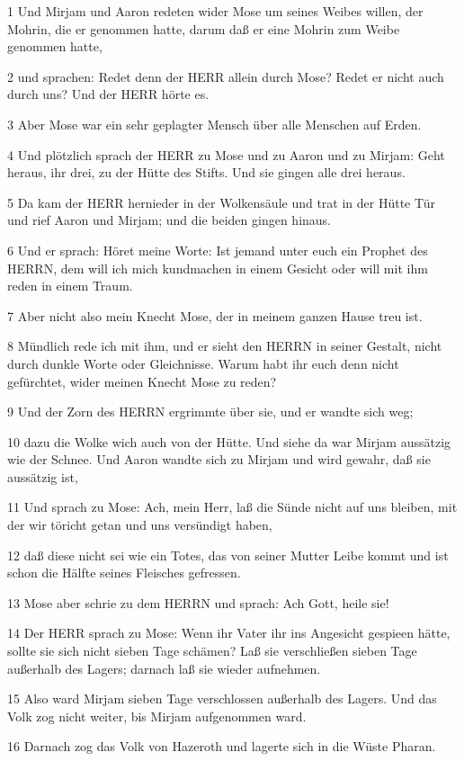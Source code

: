 \par 1 Und Mirjam und Aaron redeten wider Mose um seines Weibes willen, der Mohrin, die er genommen hatte, darum daß er eine Mohrin zum Weibe genommen hatte,
\par 2 und sprachen: Redet denn der HERR allein durch Mose? Redet er nicht auch durch uns? Und der HERR hörte es.
\par 3 Aber Mose war ein sehr geplagter Mensch über alle Menschen auf Erden.
\par 4 Und plötzlich sprach der HERR zu Mose und zu Aaron und zu Mirjam: Geht heraus, ihr drei, zu der Hütte des Stifts. Und sie gingen alle drei heraus.
\par 5 Da kam der HERR hernieder in der Wolkensäule und trat in der Hütte Tür und rief Aaron und Mirjam; und die beiden gingen hinaus.
\par 6 Und er sprach: Höret meine Worte: Ist jemand unter euch ein Prophet des HERRN, dem will ich mich kundmachen in einem Gesicht oder will mit ihm reden in einem Traum.
\par 7 Aber nicht also mein Knecht Mose, der in meinem ganzen Hause treu ist.
\par 8 Mündlich rede ich mit ihm, und er sieht den HERRN in seiner Gestalt, nicht durch dunkle Worte oder Gleichnisse. Warum habt ihr euch denn nicht gefürchtet, wider meinen Knecht Mose zu reden?
\par 9 Und der Zorn des HERRN ergrimmte über sie, und er wandte sich weg;
\par 10 dazu die Wolke wich auch von der Hütte. Und siehe da war Mirjam aussätzig wie der Schnee. Und Aaron wandte sich zu Mirjam und wird gewahr, daß sie aussätzig ist,
\par 11 Und sprach zu Mose: Ach, mein Herr, laß die Sünde nicht auf uns bleiben, mit der wir töricht getan und uns versündigt haben,
\par 12 daß diese nicht sei wie ein Totes, das von seiner Mutter Leibe kommt und ist schon die Hälfte seines Fleisches gefressen.
\par 13 Mose aber schrie zu dem HERRN und sprach: Ach Gott, heile sie!
\par 14 Der HERR sprach zu Mose: Wenn ihr Vater ihr ins Angesicht gespieen hätte, sollte sie sich nicht sieben Tage schämen? Laß sie verschließen sieben Tage außerhalb des Lagers; darnach laß sie wieder aufnehmen.
\par 15 Also ward Mirjam sieben Tage verschlossen außerhalb des Lagers. Und das Volk zog nicht weiter, bis Mirjam aufgenommen ward.
\par 16 Darnach zog das Volk von Hazeroth und lagerte sich in die Wüste Pharan.

